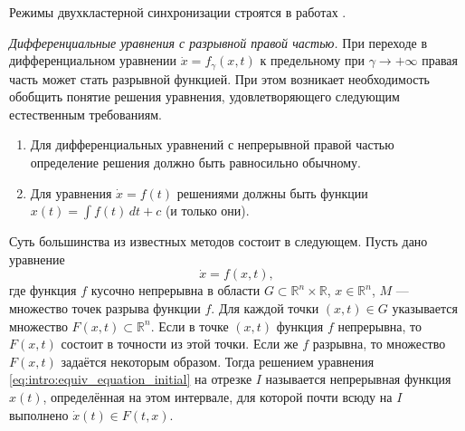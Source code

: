 %
%

Режимы двухкластерной синхронизации строятся в работах \cite{Glyzin2016a, Glyzin2022}.

\textit{Дифференциальные уравнения с разрывной правой частью.} При переходе в дифференциальном уравнении 
$\dot{x} = f_\gamma(x, t)$ к предельному при $\gamma \to +\infty$ правая часть может стать разрывной функцией. При этом возникает необходимость обобщить понятие решения уравнения, удовлетворяющего следующим естественным требованиям.
\begin{enumerate}
	\item Для дифференциальных уравнений с непрерывной правой частью определение решения должно быть равносильно обычному.
	\item Для уравнения $\dot{x} = f(t)$ решениями должны быть функции $x(t) = \int f(t)\, dt + c$ (и только они).
\end{enumerate}
Суть большинства из известных методов состоит в следующем. Пусть дано уравнение
\begin{equation}
	\label{eq:intro:equiv_equation_initial}
	\dot{x} = f(x, t),
\end{equation}
где функция $f$ кусочно непрерывна в области $G \subset \mathbb{R}^n \times \mathbb{R}$, $x \in \mathbb{R}^n$, $M$ --- множество точек разрыва функции $f$. Для каждой точки $(x, t) \in G$ указывается множество $F(x, t) \subset \mathbb{R}^n$. Если в точке $(x, t)$ функция $f$ непрерывна, то $F(x, t)$ состоит в точности из этой точки. Если же $f$ разрывна, то множество $F(x, t)$ задаётся некоторым образом. Тогда решением уравнения \eqref{eq:intro:equiv_equation_initial} на отрезке $I$ называется непрерывная функция $x(t)$, определённая на этом интервале, для которой почти всюду на $I$ выполнено $\dot{x}(t) \in F(t, x)$.

